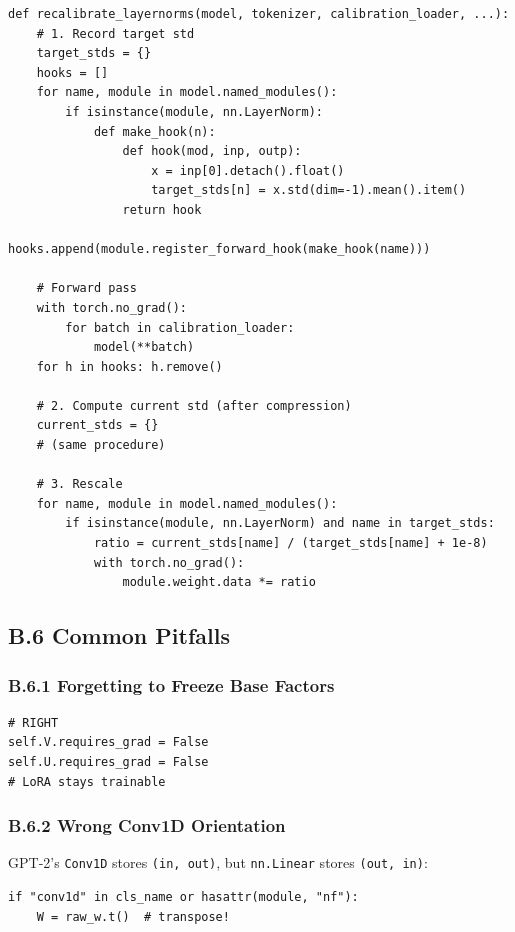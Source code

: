 \begin{lstlisting}
def recalibrate_layernorms(model, tokenizer, calibration_loader, ...):
    # 1. Record target std
    target_stds = {}
    hooks = []
    for name, module in model.named_modules():
        if isinstance(module, nn.LayerNorm):
            def make_hook(n):
                def hook(mod, inp, outp):
                    x = inp[0].detach().float()
                    target_stds[n] = x.std(dim=-1).mean().item()
                return hook
            hooks.append(module.register_forward_hook(make_hook(name)))
    
    # Forward pass
    with torch.no_grad():
        for batch in calibration_loader:
            model(**batch)
    for h in hooks: h.remove()
    
    # 2. Compute current std (after compression)
    current_stds = {}
    # (same procedure)
    
    # 3. Rescale
    for name, module in model.named_modules():
        if isinstance(module, nn.LayerNorm) and name in target_stds:
            ratio = current_stds[name] / (target_stds[name] + 1e-8)
            with torch.no_grad():
                module.weight.data *= ratio
\end{lstlisting}

\subsection{B.6 Common Pitfalls}

\subsubsection{B.6.1 Forgetting to Freeze Base Factors}

\begin{lstlisting}
# RIGHT
self.V.requires_grad = False
self.U.requires_grad = False
# LoRA stays trainable
\end{lstlisting}

\subsubsection{B.6.2 Wrong Conv1D Orientation}

GPT-2's \texttt{Conv1D} stores \texttt{(in, out)}, but \texttt{nn.Linear} stores \texttt{(out, in)}:

\begin{lstlisting}
if "conv1d" in cls_name or hasattr(module, "nf"):
    W = raw_w.t()  # transpose!
\end{lstlisting}

